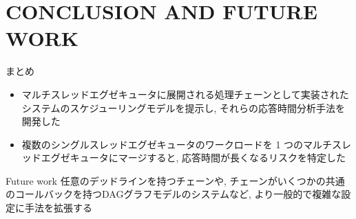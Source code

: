 
\section{CONCLUSION AND FUTURE WORK}
\label{sec: conclusion and future work}

\begin{frame}{まとめ}
    \begin{itemize}
        \item マルチスレッドエグゼキュータに展開される処理チェーンとして実装されたシステムのスケジューリングモデルを提示し, それらの応答時間分析手法を開発した
        \item 複数のシングルスレッドエグゼキュータのワークロードを 1 つのマルチスレッドエグゼキュータにマージすると, 応答時間が長くなるリスクを特定した
    \end{itemize}
\end{frame}

\begin{frame}{Future work}
    任意のデッドラインを持つチェーンや, チェーンがいくつかの共通のコールバックを持つDAGグラフモデルのシステムなど, より一般的で複雑な設定に手法を拡張する
\end{frame}
